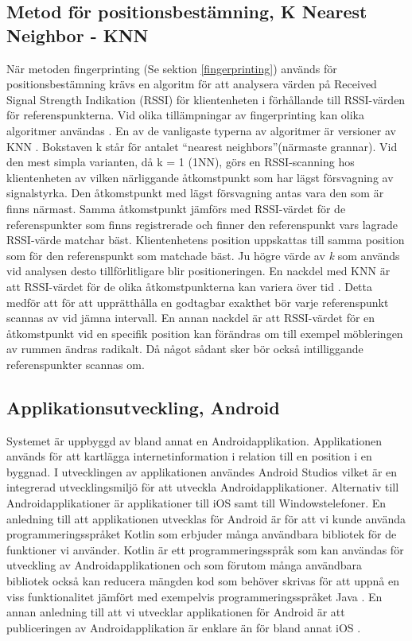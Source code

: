 \documentclass[a4paper,12pt]{article}
\begin{document}
 \subsection{Metod för positionsbestämning, K Nearest Neighbor - KNN}\label{KNN}
 När metoden fingerprinting (Se sektion \ref{fingerprinting}) används för positionsbestämning krävs en algoritm för att analysera värden på Received Signal Strength Indikation (RSSI) för klientenheten i förhållande till RSSI-värden för referenspunkterna. Vid olika tillämpningar av fingerprinting kan olika algoritmer användas \cite{tian2013fingerprint}\cite{jun2018low}. En av de vanligaste typerna av algoritmer är versioner av KNN \cite{tian2013fingerprint}.
 Bokstaven k står för antalet ``nearest neighbors''(närmaste grannar). Vid den mest simpla varianten, då k = 1 (1NN), görs en RSSI-scanning hos klientenheten av vilken närliggande åtkomstpunkt som har lägst försvagning av signalstyrka. Den åtkomstpunkt med lägst försvagning antas vara den som är finns närmast. Samma åtkomstpunkt jämförs med RSSI-värdet för de referenspunkter som finns registrerade och finner den referenspunkt vars lagrade RSSI-värde matchar bäst. Klientenhetens position uppskattas till samma position som för den referenspunkt som matchade bäst.
 Ju högre värde av \textit{k} som används vid analysen desto tillförlitligare blir positioneringen\cite{yiu2017wireless}.
 En nackdel med KNN är att RSSI-värdet för de olika åtkomstpunkterna kan variera över tid \cite{tian2013fingerprint}. Detta medför att för att upprätthålla en godtagbar exakthet bör varje referenspunkt scannas av vid jämna intervall.
 En annan nackdel är att RSSI-värdet för en åtkomstpunkt vid en specifik position kan förändras om till exempel möbleringen av rummen ändras radikalt\cite{zanca2008experimental}. Då något sådant sker bör också intilliggande referenspunkter scannas om.

 \subsection{Applikationsutveckling, Android}
 Systemet är uppbyggd av bland annat en Androidapplikation. Applikationen används för att kartlägga internetinformation i relation till en position i en byggnad. I utvecklingen av applikationen användes Android Studios vilket är en integrerad utvecklingsmiljö för att utveckla Androidapplikationer. Alternativ till Androidapplikationer är applikationer till iOS samt till Windowstelefoner. En anledning till att applikationen utvecklas för Android är för att vi kunde använda programmeringsspråket Kotlin som erbjuder många användbara bibliotek för de funktioner vi använder. Kotlin är ett programmeringsspråk som kan användas för utveckling av Androidapplikationen och som
 förutom många användbara bibliotek också kan reducera mängden kod som behöver skrivas för att uppnå en viss funktionalitet jämfört med exempelvis programmeringsspråket Java \cite{kotlin}.
 En annan anledning till att vi utvecklar applikationen för Android är att publiceringen av Androidapplikation är enklare än för bland annat iOS \cite{submitIphone}\cite{android}.
\end{document}
